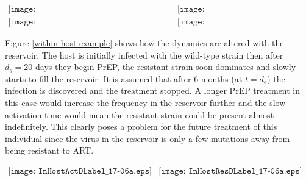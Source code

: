 \documentclass[DIV=15]{scrartcl}
\begin{document}
  

\begin{figure*}[h]
 \begin{center}$
 \begin{array}{cc}
 \texttt{[image: NoHomeo\_Active\_S1\_HigFit075\_09\_06b.png]} &
 \texttt{[image: NoHomeo\_Reservoir\_S1\_HigFit075\_09\_06b.png]} \\
  \texttt{[image: Homeo\_Active\_S1\_HigFit075\_09\_06b.png]} &
 \texttt{[image: Homeo\_Reservoir\_S1\_HigFit075\_09\_06b.png]}
 \end{array}$
 \end{center}
 \caption{The frequency of the drug resistant strain in the active and latent T cells for different parameter values one year after PrEP has stopped for a host with a pre-existing infection. (a,b) No homeostatic proliferation, i.e. $k = ar_L$. (c,d) With homeostatic proliferation and $a = 0.01$. The replication rate  of the resistant strain is $75\%$ that of the wild-type. }
 \label{within host parameter sweep}
 \end{figure*}
Figure \ref{within host example} shows how the dynamics are altered with the reservoir. The host is initially infected with the wild-type strain then after $d_s = 20$ days they begin PrEP, the resistant strain soon dominates and slowly starts to fill the reservoir.  It is assumed that after $6$ months (at $t = d_e$) the infection is discovered and the treatment stopped. A longer PrEP treatment  in this case would increase the frequency in the  reservoir  further and  the slow  activation time would mean the resistant strain could be present almost indefinitely. This clearly poses a problem for the future treatment of this individual since the virus in the reservoir is only a few mutations away from being resistant to ART.


\begin{figure*}[h]
 \begin{center}$
 \begin{array}{cc}
 \texttt{[image: InHostActDLabel\_17-06a.eps]} &
 \texttt{[image: InHostResDLabel\_17-06a.eps]} 
 \end{array}$
 \end{center}
 \caption{The drug is administered $d_s = 20$ days after initial infection  and ends after $6$ months at $d_e$, during this time efficacy is at a maximum ($D = 1$). Where $\gamma_2=0.75$, $k=\SI{1.7e-3}{}$, $a = 0.01$ and $r_L = 1.7$.  }
 \label{within host example}
 \end{figure*}
\end{document}
